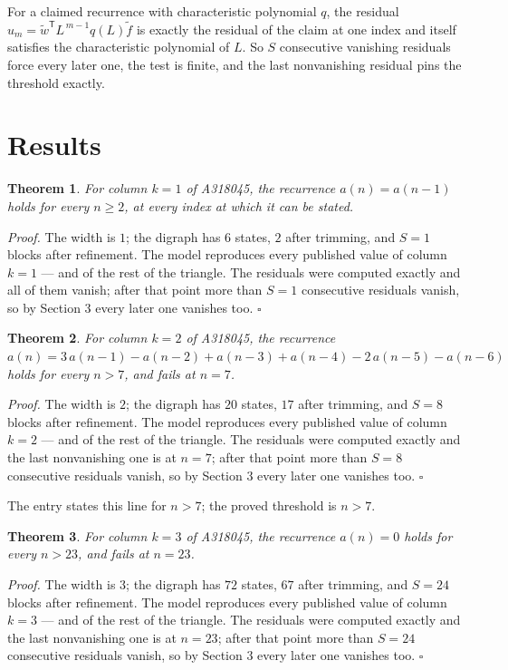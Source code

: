 \documentclass[11pt]{article}
\newtheorem{theorem}{Theorem}
\theoremstyle{definition}
\begin{document}
For a claimed recurrence with characteristic polynomial $q$, the residual $u_m = \tilde w^{\mathsf T}L^{\,m-1}q(L)\tilde f$ is exactly the residual of the claim at one index and itself satisfies the characteristic polynomial of $L$. So $S$ consecutive vanishing residuals force every later one, the test is finite, and the last nonvanishing residual pins the threshold exactly.

\section{Results}

\begin{theorem} For column $k = 1$ of A318045, the recurrence $a(n) = a(n-1)$ holds for every $n \ge 2$, at every index at which it can be stated.\end{theorem}

{\itshape Proof.} The width is $1$; the digraph has $6$ states, $2$ after trimming, and $S = 1$ blocks after refinement. The model reproduces every published value of column $k = 1$ --- and of the rest of the triangle. The residuals were computed exactly and all of them vanish; after that point more than $S = 1$ consecutive residuals vanish, so by Section 3 every later one vanishes too. $\square$

\begin{theorem} For column $k = 2$ of A318045, the recurrence $a(n) = 3\,a(n-1) - a(n-2) + a(n-3) + a(n-4) - 2\,a(n-5) - a(n-6)$ holds for every $n > 7$, and fails at $n = 7$.\end{theorem}

{\itshape Proof.} The width is $2$; the digraph has $20$ states, $17$ after trimming, and $S = 8$ blocks after refinement. The model reproduces every published value of column $k = 2$ --- and of the rest of the triangle. The residuals were computed exactly and the last nonvanishing one is at $n = 7$; after that point more than $S = 8$ consecutive residuals vanish, so by Section 3 every later one vanishes too. $\square$

The entry states this line for $n > 7$; the proved threshold is $n > 7$.

\begin{theorem} For column $k = 3$ of A318045, the recurrence $a(n) = 0$ holds for every $n > 23$, and fails at $n = 23$.\end{theorem}

{\itshape Proof.} The width is $3$; the digraph has $72$ states, $67$ after trimming, and $S = 24$ blocks after refinement. The model reproduces every published value of column $k = 3$ --- and of the rest of the triangle. The residuals were computed exactly and the last nonvanishing one is at $n = 23$; after that point more than $S = 24$ consecutive residuals vanish, so by Section 3 every later one vanishes too. $\square$
\end{document}
